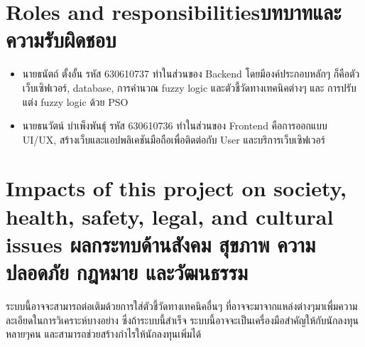 \begin{figure}[ht]
    \centering
\end{figure}


\section{\ifenglish Roles and responsibilities\else บทบาทและความรับผิดชอบ\fi}
\begin{itemize}
    \item นายธนัตถ์ ตั้งอั้น รหัส 630610737 ทำในส่วนของ Backend โดยมีองค์ประกอบหลักๆ ก็คือตัวเว็บเซิฟเวอร์, database, การคำนวณ fuzzy logic และตัวชี้วัดทางเทคนิคต่างๆ และ
การปรับแต่ง fuzzy logic ด้วย PSO
    \item นายธนวัตน์ บำเพ็งพันธุ์ รหัส 630610736 ทำในส่วนของ Frontend คือการออกแบบ UI/UX, สร้างเว็บและแอปพลิเคชันมือถือเพื่อติดต่อกับ User และบริการเว็บเซิฟเวอร์
\end{itemize}

\section{\ifenglish%
Impacts of this project on society, health, safety, legal, and cultural issues
\else%
ผลกระทบด้านสังคม สุขภาพ ความปลอดภัย กฎหมาย และวัฒนธรรม
\fi}
ระบบนี้อาจจะสามารถต่อเติมด้วยการใส่ตัวชี้วัดทางเทคนิคอื่นๆ ที่อาจจะมาจากแหล่งต่างๆมาเพื่มความละเอียดในการวิเคราะห์บางอย่าง
ซึ่งถ้าระบบนี้สำเร็จ ระบบนี้อาจจะเป็นเครื่องมือสำคัญให้กับนักลงทุนหลายๆคน และสามารถช่วยสร้างกำไรให้นักลงทุนเพิ่มได้ 